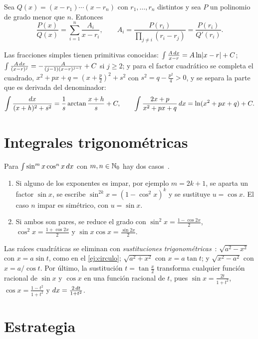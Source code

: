 \begin{proposicion}\label{prop:raices-simples}
Sea $Q(x)=(x-r_1)\cdots(x-r_n)$ con $r_1,\dots,r_n$ distintos y sea $P$ un polinomio de grado menor que $n$. Entonces
\[
\frac{P(x)}{Q(x)}=\sum_{i=1}^{n}\frac{A_i}{x-r_i},\qquad A_i=\frac{P(r_i)}{\prod_{j\neq i}(r_i-r_j)}=\frac{P(r_i)}{Q'(r_i)} .
\]
\end{proposicion}

Las fracciones simples tienen primitivas conocidas: $\int\frac{A\mathop{}\!d x}{x-r}=A\ln\lvert x-r\rvert+C$; $\int\frac{A\mathop{}\!d x}{(x-r)^{j}}=-\frac{A}{(j-1)(x-r)^{j-1}}+C$ si $j\ge2$; y para el factor cuadrático se completa el cuadrado, $x^{2}+px+q=(x+\frac p2)^{2}+s^{2}$ con $s^{2}=q-\frac{p^{2}}{4}>0$, y se separa la parte que es derivada del denominador:
\[
\int\frac{\mathop{}\!d x}{(x+h)^{2}+s^{2}}=\frac1s\arctan\frac{x+h}{s}+C,\qquad\int\frac{2x+p}{x^{2}+px+q}\mathop{}\!d x=\ln(x^{2}+px+q)+C .
\]

\addtocounter{definicion}{1}%

\section{Integrales trigonométricas}

Para $\int\sin^{m}x\cos^{n}x\mathop{}\!d x$ con $m,n\in\mathbb{N}_0$ hay dos casos~\cite[§3.2]{openstax2}.
\begin{enumerate}
  \item Si alguno de los exponentes es impar, por ejemplo $m=2k+1$, se aparta un factor $\sin x$, se escribe $\sin^{2k}x=(1-\cos^{2}x)^{k}$ y se sustituye $u=\cos x$. El caso $n$ impar es simétrico, con $u=\sin x$.
  \item Si ambos son pares, se reduce el grado con $\sin^{2}x=\frac{1-\cos2x}{2}$, $\cos^{2}x=\frac{1+\cos2x}{2}$ y $\sin x\cos x=\frac{\sin2x}{2}$.
\end{enumerate}

\addtocounter{definicion}{1}%

Las raíces cuadráticas se eliminan con \emph{sustituciones trigonométricas}~\cite[§3.3]{openstax2}: $\sqrt{a^{2}-x^{2}}$ con $x=a\sin t$, como en el \cref{ej:circulo}; $\sqrt{a^{2}+x^{2}}$ con $x=a\tan t$; y $\sqrt{x^{2}-a^{2}}$ con $x=a/\cos t$. Por último, la sustitución $t=\tan\frac x2$ transforma cualquier función racional de $\sin x$ y $\cos x$ en una función racional de $t$, pues $\sin x=\frac{2t}{1+t^{2}}$, $\cos x=\frac{1-t^{2}}{1+t^{2}}$ y $\mathop{}\!d x=\frac{2\mathop{}\!d t}{1+t^{2}}$.

\section{Estrategia}

